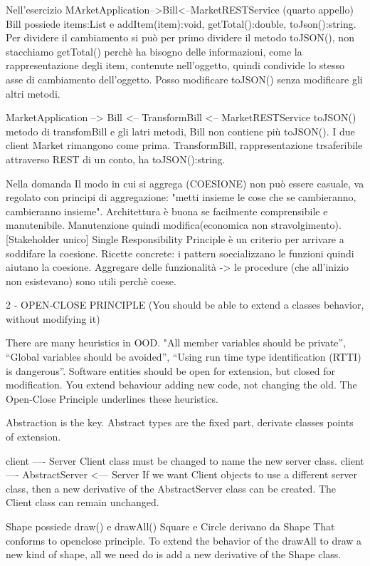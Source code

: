 \documentclass{report}
\begin{document}
Nell'esercizio 
MArketApplication-->Bill<--MarketRESTService (quarto appello)
Bill possiede items:List e addItem(item):void, getTotal():double,  toJson():string. 
Per dividere il cambiamento si può per primo dividere il metodo toJSON(), non stacchiamo getTotal() perchè ha bisogno delle informazioni, come la rappresentazione degli item, contenute nell'oggetto, quindi condivide lo stesso asse di cambiamento dell'oggetto. Posso modificare toJSON() senza modificare gli altri metodi.

MarketApplication --> Bill <-- TransformBill <-- MarketRESTService
toJSON() metodo di transfomBill e gli latri metodi, Bill non contiene più toJSON(). I due client Market rimangono come prima.
TransformBill, rappresentazione trsaferibile attraverso REST di un conto, ha toJSON():string.

Nella domanda
Il modo in cui si aggrega (COESIONE) non può essere casuale, va regolato con principi di aggregazione: "metti insieme le cose che se cambieranno, cambieranno insieme". Architettura è buona se facilmente comprensibile e manutenibile. Manutenzione quindi modifica(economica non stravolgimento).[Stakeholder unico] Single Responsibility Principle è un criterio per arrivare a soddifare la coesione. Ricette concrete: i pattern soecializzano le funzioni quindi aiutano la coesione.
Aggregare delle funzionalità -> le procedure (che all'inizio non esistevano) sono utili perchè coese. 

2 - OPEN‐CLOSE PRINCIPLE (You should be able to extend a classes behavior, without modifying it)

There are many heuristics in OOD. "All member variables should be private”, “Global variables should be avoided”, “Using run time type identification (RTTI) is dangerous”. 
Software entities should be open for extension, but closed for modification. You extend behaviour adding new code, not changing the old. The Open‐Close Principle underlines these heuristics.

Abstraction is the key. Abstract types are the fixed part, derivate classes points of extension.

client ---- Server
Client class must be changed to name the new server class.
client ---- AbstractServer <--- Server
If we want Client objects to use a different server class, then a new
derivative of the AbstractServer class can be created. The Client class can remain unchanged.

Shape possiede draw() e drawAll()
Square e Circle derivano da Shape
That conforms to openclose principle. To extend the behavior of the drawAll to draw a new kind of shape, all we need do is add a new derivative of the Shape class.
\end{document}
